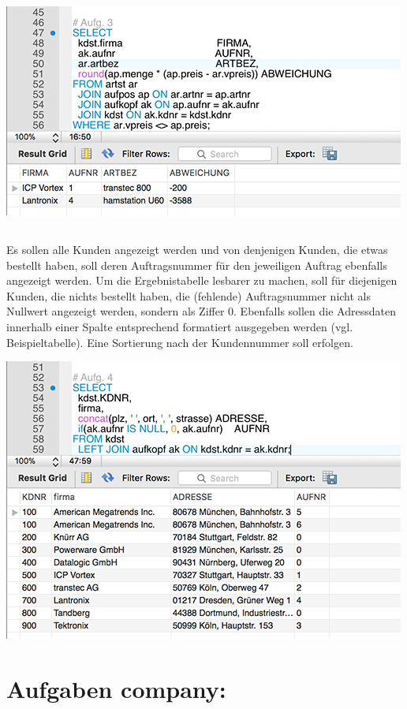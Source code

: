 \documentclass{article}
\begin{document}
\includegraphics{mat_inf3}

\subsection{}
Es sollen alle Kunden angezeigt werden und von denjenigen Kunden, die etwas bestellt haben, soll deren Auftragsnummer für den jeweiligen Auftrag ebenfalls angezeigt werden. Um die Ergebnistabelle lesbarer zu machen, soll für diejenigen Kunden, die nichts bestellt haben, die (fehlende) Auftragsnummer nicht als Nullwert angezeigt werden, sondern als Ziffer 0. Ebenfalls sollen die Adressdaten innerhalb einer Spalte entsprechend formatiert ausgegeben werden (vgl. Beispieltabelle). Eine Sortierung nach der Kundennummer soll erfolgen.

\includegraphics{mat_inf4}

\pagebreak
\setcounter{subsection}{0}
\section* {Aufgaben company:}
\end{document}

